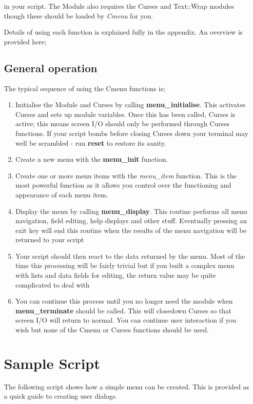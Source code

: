 \documentclass[a4paper]{scrartcl}
\begin{document}
in your script. The Module also requires the Curses and Text::Wrap modules though these should be loaded by \textit{Cmenu} for you.

Details of using each function is explained fully in the appendix. An overview is provided here;

\subsection{General operation}
The typical sequence of using the Cmenu functions is;
\begin{enumerate}
\item Initialise the Module and Curses by calling \textbf{menu\_initialise}. This activates Curses and sets up module variables. Once this has been called, Curses is active; this means screen I/O should only be performed through Curses functions. If your script bombs before closing Curses down your terminal may well be scrambled - run \textbf{reset} to restore its sanity.
\item Create a new menu with the \textbf{menu\_init} function.
\item Create one or more menu items with the \textit{menu\_item} function. This is the most powerful function as it allows you control over the functioning and appearance of each menu item.
\item Display the menu by calling \textbf{menu\_display}. This routine performs all menu navigation, field editing, help displays and other stuff. Eventually pressing an exit key will end this routine when the results of the menu navigation will be returned to your script
\item Your script should then react to the data returned by the menu. Most of the time this processing will be fairly trivial but if you built a complex menu with lists and data fields for editing, the return value may be quite complicated to deal with
\item You can continue this process until you no longer need the module when \textbf{menu\_terminate} should be called. This will closedown Curses so that screen I/O will return to normal. You can continue user interaction if you wish but none of the Cmenu or Curses functions should be used.
\end{enumerate}


\appendix
\section{Sample Script}
The following script shows how a simple menu can be created. This is provided as a quick guide to creating user dialogs. 
\end{document}
